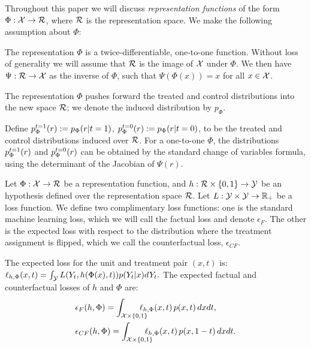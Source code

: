 Throughout this paper we will discuss \emph{representation functions} of the form
 $\Phi : \mathcal X \rightarrow \mathcal{R}$, where $\mathcal{R}$ is the representation space. We make the following assumption about $\Phi$:
\begin{thmasmp}\label{asmp:inv}
The representation $\Phi$ is a twice-differentiable, one-to-one function. Without loss of generality we will assume that $\mathcal{R}$ is the image of $\mathcal X$ under $\Phi$. We then have $\Psi :\mathcal{R} \rightarrow \mathcal X$ as the inverse of $\Phi$, such that $\Psi(\Phi(x)) = x$ for all $x \in \mathcal X$.
\end{thmasmp}
The representation $\Phi$ pushes forward the treated and control distributions into the new space $\mathcal{R}$; we denote the induced distribution by $p_\Phi$.
\begin{thmdef}\label{def:phit}
Define $p^{t=1}_\Phi(r) := p_\Phi(r|t=1)$, $p^{t=0}_\Phi(r) := p_\Phi(r|t=0)$, to be the treated and control distributions induced over $\mathcal{R}$.
For a one-to-one $\Phi$, the distributions $p^{t=1}_\Phi(r)$ and $p^{t=0}_\Phi(r)$ can be obtained by the standard change of variables formula, using the determinant of the Jacobian of $\Psi(r)$.
\end{thmdef} %

Let $\Phi : \mathcal X \rightarrow \mathcal{R}$ be a representation function, and $h :\mathcal{R} \times \{0,1\} \rightarrow \mathcal Y$ be an hypothesis defined over the representation space $\mathcal{R}$. Let $L: \mathcal Y \times \mathcal Y \rightarrow \mathbb{R}_+$ be a loss function. We define two complimentary loss functions: one is the standard machine learning loss, which we will call the factual loss and denote $\epsilon_F$. The other is the expected loss with respect to the distribution where the treatment assignment is flipped, which we call the counterfactual loss, $\epsilon_{CF}$.


\begin{thmdef}\label{def:perunitloss}
The expected loss for the unit and treatment pair $(x,t)$ is:
$\ell_{h,\Phi}(x,t) = \int_\mathcal Y L(Y_t,h(\Phi(x),t)) p(Y_t|x) dY_t.$
The expected factual and counterfactual losses of $h$ and $\Phi$ are:
\begin{align*}
&\epsilon_F(h,\Phi) = \int_{\cX \times \{0,1\}} \!\!\!\!\!\!\! \lyth\, p(x,t)\, dxdt, \\
&\epsilon_{CF}(h,\Phi) = \int_{\cX \times \{0,1\}} \!\!\!\!\!\!\! \lyth\, p(x,1-t)\, dxdt .
\end{align*}
\end{thmdef}

